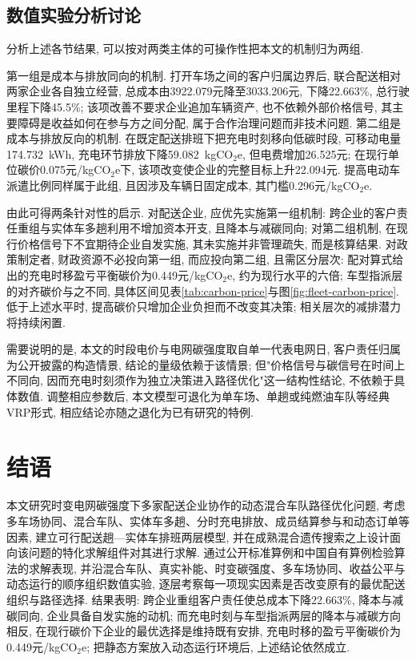\documentclass{setp-new}
\begin{document}
\subsection{数值实验分析讨论}

分析上述各节结果, 可以按对两类主体的可操作性把本文的机制归为两组.

第一组是成本与排放同向的机制. 打开车场之间的客户归属边界后, 联合配送相对两家企业各自独立经营,
总成本由3922.079元降至3033.206元, 下降22.663\%, 总行驶里程下降45.5\%;
该项改善不要求企业追加车辆资产, 也不依赖外部价格信号,
其主要障碍是收益如何在参与方之间分配, 属于合作治理问题而非技术问题.
第二组是成本与排放反向的机制. 在既定配送排班下把充电时刻移向低碳时段,
可移动电量174.732~kWh, 充电环节排放下降59.082~kgCO$_2$e, 但电费增加26.525元;
在现行单位碳价0.075元/kgCO$_2$e下, 该项改变使企业的完整目标上升22.094元.
提高电动车派遣比例同样属于此组, 且因涉及车辆日固定成本, 其门槛0.296元/kgCO$_2$e.

由此可得两条针对性的启示. 对配送企业, 应优先实施第一组机制:
跨企业的客户责任重组与实体车多趟利用不增加资本开支, 且降本与减碳同向;
对第二组机制, 在现行价格信号下不宜期待企业自发实施, 其未实施并非管理疏失, 而是核算结果.
对政策制定者, 财政资源不必投向第一组, 而应投向第二组, 且需区分层次:
配对算式给出的充电时移盈亏平衡碳价为0.449元/kgCO$_2$e, 约为现行水平的六倍;
车型指派层的对齐碳价与之不同, 具体区间见表\ref{tab:carbon-price}与图\ref{fig:fleet-carbon-price}.
低于上述水平时, 提高碳价只增加企业负担而不改变其决策; 相关层次的减排潜力将持续闲置.

需要说明的是, 本文的时段电价与电网碳强度取自单一代表电网日,
客户责任归属为公开披露的构造情景, 结论的量级依赖于该情景;
但"价格信号与碳信号在时间上不同向, 因而充电时刻须作为独立决策进入路径优化"这一结构性结论,
不依赖于具体数值. 调整相应参数后, 本文模型可退化为单车场、单趟或纯燃油车队等经典VRP形式,
相应结论亦随之退化为已有研究的特例.

\section{结语}

本文研究时变电网碳强度下多家配送企业协作的动态混合车队路径优化问题,
考虑多车场协同、混合车队、实体车多趟、分时充电排放、成员结算参与和动态订单等因素,
建立可行配送趟—实体车排班两层模型,
并在成熟混合遗传搜索之上设计面向该问题的特化求解组件对其进行求解.
通过公开标准算例和中国自有算例检验算法的求解表现,
并沿混合车队、真实补能、时变碳强度、多车场协同、收益公平与动态运行的顺序组织数值实验,
逐层考察每一项现实因素是否改变原有的最优配送组织与路径选择.
结果表明: 跨企业重组客户责任使总成本下降22.663\%, 降本与减碳同向, 企业具备自发实施的动机;
而充电时刻与车型指派两层的降本与减碳方向相反,
在现行碳价下企业的最优选择是维持既有安排, 充电时移的盈亏平衡碳价为0.449元/kgCO$_2$e;
把静态方案放入动态运行环境后, 上述结论依然成立.
\end{document}
